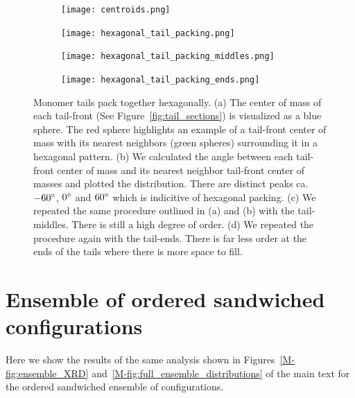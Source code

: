 \documentclass{article}
\begin{document}
  \begin{figure}[!htb]
        \centering
        \begin{subfigure}{0.45\textwidth}
        \texttt{[image: centroids.png]}
		\caption{}\label{fig:centroids}
        \end{subfigure}
        \begin{subfigure}{0.45\textwidth}
        \texttt{[image: hexagonal\_tail\_packing.png]}
        \caption{}\label{fig:tail_fronts}
        \end{subfigure}
        \begin{subfigure}{0.45\textwidth}
        \texttt{[image: hexagonal\_tail\_packing\_middles.png]}
        \caption{}\label{fig:tail_middles}
        \end{subfigure}
        \begin{subfigure}{0.45\textwidth}
        \texttt{[image: hexagonal\_tail\_packing\_ends.png]}
        \caption{}\label{fig:tail_ends}
        \end{subfigure}
        \caption{Monomer tails pack together hexagonally. (a) The center of mass
        of each tail-front (See Figure~\ref{fig:tail_sections}) is visualized as
        a blue sphere. The red sphere highlights an example of a tail-front 
        center of mass with its nearest neighbors (green spheres) surrounding it
        in a hexagonal pattern. (b) We calculated the angle between each tail-front
        center of mass and its nearest neighbor tail-front center of masses and 
        plotted the distribution. There are distinct peaks ca. $-60\degree$, $0\degree$ and
        $60\degree$ which is indicitive of hexagonal packing. (c) We repeated the 
        same procedure outlined in (a) and (b) with the tail-middles. There is still 
        a high degree of order. (d) We repeated the procedure again with the tail-ends.
        There is far less order at the ends of the tails where there is more
        space to fill.}\label{fig:tail_packing}
  \end{figure}
  
  \clearpage
  
  \section{Ensemble of ordered sandwiched configurations}\label{section:sandwiched_ensemble}
  
  Here we show the results of the same analysis shown in Figures~\ref{M-fig:ensemble_XRD} 
  and~\ref{M-fig:full_ensemble_distributions} of the main text for the 
  ordered sandwiched ensemble of configurations.
  
\end{document}
